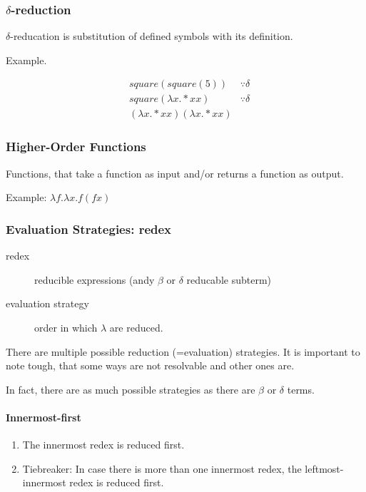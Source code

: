 \subsubsection{$\delta$-reduction}
$\delta$-reducation is substitution of defined symbols with its definition.

Example. 

\begin{align*}
&square(square(5)) & \because \delta \\
&square(\lambda x. * x x) & \because \delta \\
& (\lambda x. * x x)(\lambda x. * x x) & 
\end{align*}

\subsubsection{Higher-Order Functions}

Functions, that take a function as input and/or returns a function as output.

Example: $\lambda f . \lambda x. f (f x)$

\subsubsection{Evaluation Strategies: redex}
\begin{description}
	\item[redex] reducible expressions (andy $\beta$ or $\delta$ reducable subterm)
	\item[evaluation strategy] order in which $\lambda$ are reduced.
\end{description}

There are multiple possible reduction (=evaluation) strategies. It is important to note tough, that some ways are not resolvable and other ones are.

In fact, there are as much possible strategies as there are $\beta$ or $\delta$ terms.

\paragraph{Innermost-first}

\begin{enumerate}
	\item The innermost redex is reduced first.
	\item Tiebreaker: In case there is more than one innermost redex, the leftmost-innermost redex is reduced first.
\end{enumerate}

